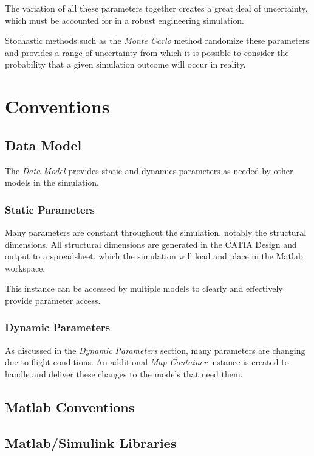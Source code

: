 \documentclass[]{article}
\begin{document}
The variation of all these parameters together creates a great deal of
uncertainty, which must be accounted for in a robust engineering
simulation.

Stochastic methods such as the \emph{Monte Carlo} method randomize these
parameters and provides a range of uncertainty from which it is possible
to consider the probability that a given simulation outcome will occur
in reality.

\section{Conventions}\label{conventions}

\subsection{Data Model}\label{data-model}

The \emph{Data Model} provides static and dynamics parameters as needed
by other models in the simulation.

\subsubsection{Static Parameters}\label{static-parameters-1}

Many parameters are constant throughout the simulation, notably the
structural dimensions. All structural dimensions are generated in the
CATIA Design and output to a spreadsheet, which the simulation will load
and place in the Matlab workspace.

This instance can be accessed by multiple models to clearly and
effectively provide parameter access.

\subsubsection{Dynamic Parameters}\label{dynamic-parameters-1}

As discussed in the \emph{Dynamic Parameters} section, many parameters
are changing due to flight conditions. An additional \emph{Map
Container} instance is created to handle and deliver these changes to
the models that need them.

\subsection{Matlab Conventions}\label{matlab-conventions}

\subsection{Matlab/Simulink Libraries}\label{matlabsimulink-libraries}
\end{document}
